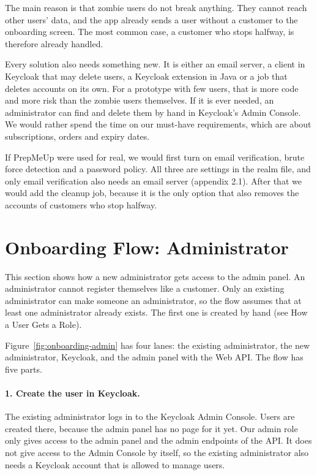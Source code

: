 \documentclass[a4paper,11pt]{article}
\begin{document}
The main reason is that zombie users do not break anything. They cannot reach other users' data, and the app already sends a user without a customer to the onboarding screen. The most common case, a customer who stops halfway, is therefore already handled.

Every solution also needs something new. It is either an email server, a client in Keycloak that may delete users, a Keycloak extension in Java or a job that deletes accounts on its own. For a prototype with few users, that is more code and more risk than the zombie users themselves. If it is ever needed, an administrator can find and delete them by hand in Keycloak's Admin Console. We would rather spend the time on our must-have requirements, which are about subscriptions, orders and expiry dates.

If PrepMeUp were used for real, we would first turn on email verification, brute force detection and a password policy. All three are settings in the realm file, and only email verification also needs an email server (appendix 2.1). After that we would add the cleanup job, because it is the only option that also removes the accounts of customers who stop halfway.

\section{Onboarding Flow: Administrator}\label{sec:onboarding-admin}
This section shows how a new administrator gets access to the admin panel. An administrator cannot register themselves like a customer. Only an existing administrator can make someone an administrator, so the flow assumes that at least one administrator already exists. The first one is created by hand (see How a User Gets a Role).


Figure~\ref{fig:onboarding-admin} has four lanes: the existing administrator, the new administrator, Keycloak, and the admin panel with the Web API. The flow has five parts.

\paragraph{1. Create the user in Keycloak.} The existing administrator logs in to the Keycloak Admin Console. Users are created there, because the admin panel has no page for it yet. Our admin role only gives access to the admin panel and the admin endpoints of the API. It does not give access to the Admin Console by itself, so the existing administrator also needs a Keycloak account that is allowed to manage users.
\end{document}
